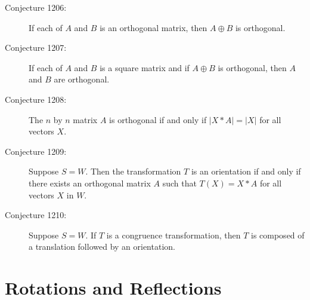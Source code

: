 \documentclass{article}
\begin{document}
\begin{description}
  \item[Conjecture 1206:] If each of $A$ and $B$ is an orthogonal matrix, then $A \oplus B$ is orthogonal.

  \item[Conjecture 1207:] If each of $A$ and $B$ is a square matrix and if $A \oplus B$ is orthogonal, then $A$ and $B$ are orthogonal.

  \item[Conjecture 1208:] The $n$ by $n$ matrix $A$ is orthogonal if and only if $\vert X*A \vert = \vert X \vert$ for all vectors $X$.

  \item[Conjecture 1209:] Suppose $S=W$. Then the transformation $T$ is an orientation if and only if there exists an orthogonal matrix $A$ such that $T(X)=X*A$ for all vectors $X$ in $W$.

  \item[Conjecture 1210:] Suppose $S=W$. If $T$ is a congruence transformation, then $T$ is composed of a translation followed by an orientation.

\end{description}


\section{Rotations and Reflections}
\end{document}

